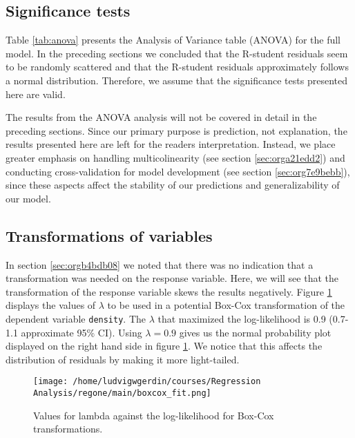 \documentclass[11pt]{article}
\begin{document}
\subsection{Significance tests}
\label{sec:orgddccd55}

Table \ref{tab:anova} presents the Analysis of Variance table (ANOVA) for the full model. In the 
preceding sections we concluded that the R-student residuals seem to be randomly scattered and 
that the R-student residuals approximately follows a normal distribution. Therefore, we assume 
that the significance tests presented here are valid. 

The results from the ANOVA analysis will not be covered in detail in the preceding sections. Since
our primary purpose is prediction, not explanation, the results presented here are left for the 
readers interpretation. Instead, we place greater emphasis on handling multicolinearity 
(see section \ref{sec:orga21edd2}) and conducting
cross-validation for model development (see section \ref{sec:org7e9bebb}),
since these aspects affect the stability of our predictions and generalizability of our model.



\subsection{Transformations of variables}
\label{sec:org323e071}

In section \ref{sec:orgb4bdb08} we noted that there was no indication that a transformation was needed on the 
response variable. Here, we will see that the transformation of the response variable skews the results negatively.
Figure \ref{fig:orgd176955} displays the values of \(\lambda\) to be used in a potential Box-Cox transformation of 
the dependent variable \texttt{density}. The \(\lambda\) that maximized the log-likelihood is 0.9 
(0.7-1.1 approximate 95\% CI). Using \(\lambda = 0.9\) gives us the normal probability plot displayed on the 
right hand side in figure \ref{fig:orgd176955}. We notice that this affects the distribution of residuals by
making it more light-tailed. 

\begin{figure}[h]
\centering
\texttt{[image: /home/ludvigwgerdin/courses/Regression Analysis/regone/main/boxcox\_fit.png]}
\caption{\label{fig:orgd176955}
Values for lambda against the log-likelihood for Box-Cox transformations.}
\end{figure}
\end{document}
